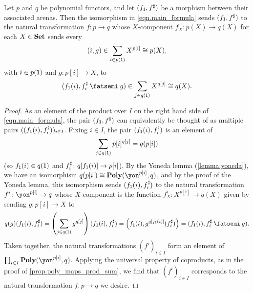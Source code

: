 \documentclass[Book-Poly]{subfiles}
\begin{document}
\begin{proposition} \label{prop.morph_arena_to_func}
Let $p$ and $q$ be polynomial functors, and let $(f_{\textsf{1}}, f^\sharp)$ be a morphism between their associated arenas.
Then the isomorphism in \eqref{eqn.main_formula} sends $(f_{\textsf{1}}, f^\sharp)$ to the natural transformation $f \colon p \to q$ whose $X$-component $f_X \colon p(X) \to q(X)$ for each $X \in \mathbf{Set}$ sends every
\[
    (i, g) \in \sum_{i \in p(\textsf{1})} X^{p[i]} \cong p(X),
\]
with $i \in p(\textsf{1})$ and $g \colon p[i] \to X$, to
\[
    (f_\1(i), f^\sharp_i \then g) \in \sum_{j \in q(\1)} X^{q[j]} \iso q(X).
\]
\end{proposition}
\begin{proof}
As an element of the product over $I$ on the right hand side of \eqref{eqn.main_formula}, the pair $(f_{\textsf{1}}, f^\sharp)$ can equivalently be thought of as multiple pairs $((f_{\textsf{1}}(i), f^\sharp_i))_{i \in I}$.
Fixing $i \in I$, the pair $(f_{\textsf{1}}(i), f^\sharp_i)$ is an element of
\[
    \sum_{j \in q(\textsf{1})} p[i]^{q[j]} = q(p[i])
\]
(so $f_{\textsf{1}}(i) \in q(\textsf{1})$ and $f^\sharp_i \colon q[f_{\textsf{1}}(i)] \to p[i]$).
By the Yoneda lemma (\cref{lemma.yoneda}), we have an isomorphism $q(p[i]) \iso \poly(\yon^{p[i]}, q)$, and by the proof of the Yoneda lemma, this isomorphism sends $(f_{\textsf{1}}(i), f^\sharp_i)$ to the natural transformation $f^i \colon \yon^{p[i]} \to q$ whose $X$-component is the function $f^i_X \colon X^{p[i]} \to q(X)$ given by sending $g \colon p[i] \to X$ to
\[
    q(g)(f_\1(i), f^\sharp_i) = \left(\sum_{j \in q(\1)} g^{q[j]}\right)(f_\1(i), f^\sharp_i) = \left(f_\1(i), g^{q[f_\1(i)]}(f^\sharp_i)\right) = (f_\1(i), f^\sharp_i \then g).
\]
Taken together, the natural transformations $(f^i)_{i \in I}$ form an element of $\prod_{i \in I} \poly(\yon^{p[i]}, q)$.
Applying the universal property of coproducts, as in the proof of \cref{prop.poly_maps_prod_sum}, we find that $(f^i)_{i \in I}$ corresponds to the natural transformation $f \colon p \to q$ we desire.
\end{proof}
\end{document}

